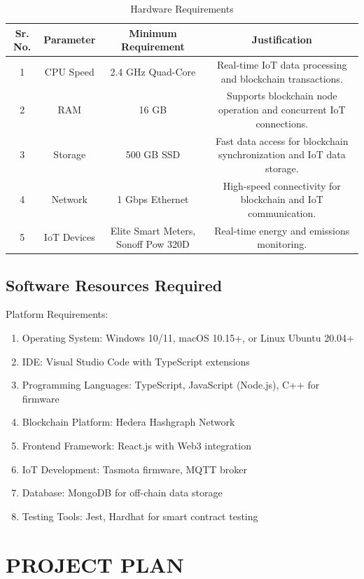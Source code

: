 \documentclass[oneside,a4paper,12pt]{book}
\renewcommand{\arraystretch}{1.5}
\begin{document}
\begin{table}[!htbp]
\begin{center}
\def\arraystretch{1.5}
  \begin{tabular}{| c | c | c | c|}
\hline
Sr. No. &	Parameter &	Minimum Requirement & Justification \\
\hline
1 &	CPU Speed &	 2.4 GHz Quad-Core  &Real-time IoT data processing and blockchain transactions.\\
\hline
2 &	RAM  &	16 GB &  Supports blockchain node operation and concurrent IoT connections.\\
\hline
3 &	Storage  &	500 GB SSD &  Fast data access for blockchain synchronization and IoT data storage.\\
\hline
4 &	Network  &	1 Gbps Ethernet &  High-speed connectivity for blockchain and IoT communication.\\
\hline
5 &	IoT Devices  &	Elite Smart Meters, Sonoff Pow 320D &  Real-time energy and emissions monitoring.\\
\hline
\end{tabular}
 \caption { Hardware Requirements }
 \label{tab:hreq}
\end{center}
\end{table}

\section{Software Resources Required}
Platform Requirements:
\begin{enumerate}
\item Operating System: Windows 10/11, macOS 10.15+, or Linux Ubuntu 20.04+
\item IDE: Visual Studio Code with TypeScript extensions
\item Programming Languages: TypeScript, JavaScript (Node.js), C++ for firmware
\item Blockchain Platform: Hedera Hashgraph Network
\item Frontend Framework: React.js with Web3 integration
\item IoT Development: Tasmota firmware, MQTT broker
\item Database: MongoDB for off-chain data storage
\item Testing Tools: Jest, Hardhat for smart contract testing
\end{enumerate}

\chapter{PROJECT PLAN}
\end{document}
